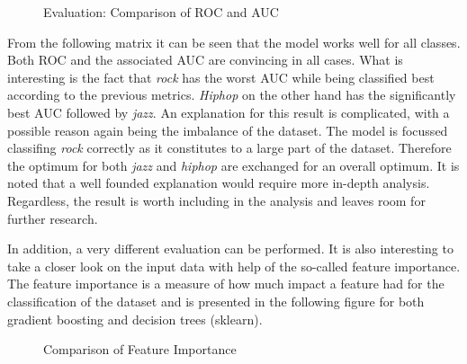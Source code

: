   \begin{figure}[H]
    \centering
    \qquad
    \caption{Evaluation: Comparison of ROC and AUC}%
    \label{fig:roc_and_auc_for_gb_and_dt}%
\end{figure}

From the following matrix it can be seen that the model works well for all classes. Both \ac{ROC} and the associated \ac{AUC} are convincing 
in all cases. What is interesting is the fact that \emph{rock} has the worst \ac{AUC} while being classified best according to the previous metrics.
\emph{Hiphop} on the other hand has the significantly best \ac{AUC} followed by \emph{jazz}. An explanation for this result is complicated, with a 
possible reason again being the imbalance of the dataset. The model is focussed classifing \emph{rock} correctly as it constitutes to a large part of the 
dataset. Therefore the optimum for both \emph{jazz} and \emph{hiphop} are exchanged for an overall optimum. It is noted that a well founded 
explanation would require more in-depth analysis. Regardless, the result is worth including in the analysis and leaves room for 
further research.   

In addition, a very different evaluation can be performed. It is also interesting to take a closer look on the input data with help of 
the so-called feature importance. The feature importance is a measure of how much impact a feature had for the classification of the 
dataset and is presented in the following figure for both gradient boosting and decision trees (sklearn). 

\begin{figure}[H]
  \centering
  \qquad
  \caption{Comparison of Feature Importance}%
  \label{fig:feature_inportance_for_gb_and_dt}%
\end{figure}

